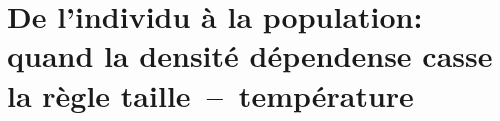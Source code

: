 \chapter[FIP]{De l'individu à la population: quand la densité dépendense casse la règle taille~--~température}

